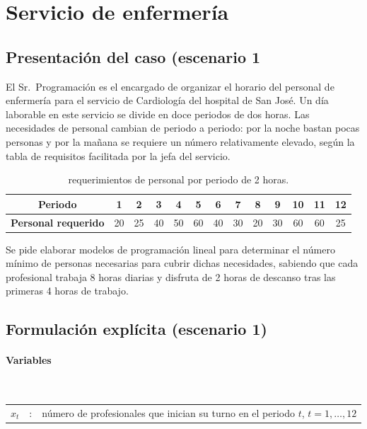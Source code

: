 \section{Servicio de enfermería}


\subsection{Presentación del caso (escenario 1}
El Sr.\ Programación es el encargado de organizar el horario del personal de enfermería para el servicio de Cardiología del hospital de San José. Un día laborable en este servicio se divide en doce periodos de dos horas. Las necesidades de personal cambian de periodo a periodo: por la noche bastan pocas personas y por la mañana se requiere un número relativamente elevado, según la tabla de requisitos facilitada por la jefa del servicio. 

\begin{table}[!h]
\centering
\begin{tabular}{c|cccccccccccc}
\toprule
\textbf{Periodo} & 1 & 2 & 3 & 4 & 5 & 6 & 7 & 8 & 9 & 10 & 11 & 12 \\
\midrule
\textbf{Personal requerido} & 20 & 25 & 40 & 50 & 60 & 40 & 30 & 20 & 30 & 60 & 60 & 25 \\
\bottomrule
\end{tabular}
\caption{requerimientos de personal por periodo de 2 horas.}
\end{table}


\noindent Se pide elaborar modelos de programación lineal para determinar el número mínimo de personas necesarias para cubrir dichas necesidades, sabiendo que cada profesional trabaja 8 horas diarias y disfruta de 2 horas de descanso tras las primeras 4 horas de trabajo.

\subsection{Formulación explícita (escenario 1)}

\paragraph{Variables}\mbox{}\\
\begin{tabular}{l c l}
    $x_t$  & : & número de profesionales que inician su turno en el periodo $t$, $t=1,\dots,12$\\
\end{tabular}

